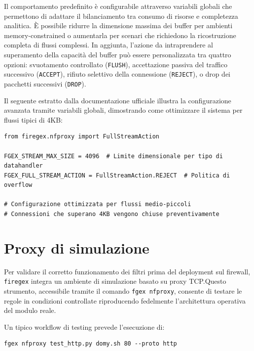 Il comportamento predefinito è configurabile attraverso variabili globali che permettono di adattare il bilanciamento tra consumo di risorse e completezza analitica. È possibile ridurre la dimensione massima dei buffer per ambienti memory-constrained o aumentarla per scenari che richiedono la ricostruzione completa di flussi complessi. In aggiunta, l'azione da intraprendere al superamento della capacità del buffer può essere personalizzata tra quattro opzioni: svuotamento controllato (\texttt{FLUSH}), accettazione passiva del traffico successivo (\texttt{ACCEPT}), rifiuto selettivo della connessione (\texttt{REJECT}), o drop dei pacchetti successivi (\texttt{DROP}).

Il seguente estratto dalla documentazione ufficiale illustra la configurazione avanzata tramite variabili globali, dimostrando come ottimizzare il sistema per flussi tipici di 4KB:\@

\begin{listing}[H]
    \begin{verbatim}
from firegex.nfproxy import FullStreamAction

FGEX_STREAM_MAX_SIZE = 4096  # Limite dimensionale per tipo di datahandler
FGEX_FULL_STREAM_ACTION = FullStreamAction.REJECT  # Politica di overflow

# Configurazione ottimizzata per flussi medio-piccoli
# Connessioni che superano 4KB vengono chiuse preventivamente
\end{verbatim}
\end{listing}

\section{Proxy di simulazione}

Per validare il corretto funzionamento dei filtri prima del deployment sul firewall, \texttt{firegex} integra un ambiente di simulazione basato su proxy TCP.\@ Questo strumento, accessibile tramite il comando \texttt{fgex nfproxy}, consente di testare le regole in condizioni controllate riproducendo fedelmente l'architettura operativa del modulo reale.  

Un tipico workflow di testing prevede l'esecuzione di:
\begin{listing}[H]
    \begin{verbatim}
fgex nfproxy test_http.py domy.sh 80 --proto http
\end{verbatim}
\end{listing}


